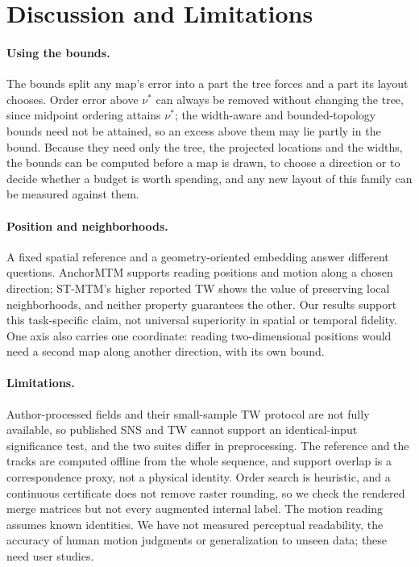 \section{Discussion and Limitations}
\paragraph{Using the bounds.} The bounds split any map's error into a part the tree forces and a part its layout chooses. Order error above $\nu^*$ can always be removed without changing the tree, since midpoint ordering attains $\nu^*$; the width-aware and bounded-topology bounds need not be attained, so an excess above them may lie partly in the bound. Because they need only the tree, the projected locations and the widths, the bounds can be computed before a map is drawn, to choose a direction or to decide whether a budget is worth spending, and any new layout of this family can be measured against them.

\paragraph{Position and neighborhoods.} A fixed spatial reference and a geometry-oriented embedding answer different questions. AnchorMTM supports reading positions and motion along a chosen direction; ST-MTM's higher reported TW shows the value of preserving local neighborhoods, and neither property guarantees the other. Our results support this task-specific claim, not universal superiority in spatial or temporal fidelity. One axis also carries one coordinate: reading two-dimensional positions would need a second map along another direction, with its own bound.

\paragraph{Limitations.} Author-processed fields and their small-sample TW protocol are not fully available, so published SNS and TW cannot support an identical-input significance test, and the two suites differ in preprocessing. The reference and the tracks are computed offline from the whole sequence, and support overlap is a correspondence proxy, not a physical identity. Order search is heuristic, and a continuous certificate does not remove raster rounding, so we check the rendered merge matrices but not every augmented internal label. The motion reading assumes known identities. We have not measured perceptual readability, the accuracy of human motion judgments or generalization to unseen data; these need user studies.

